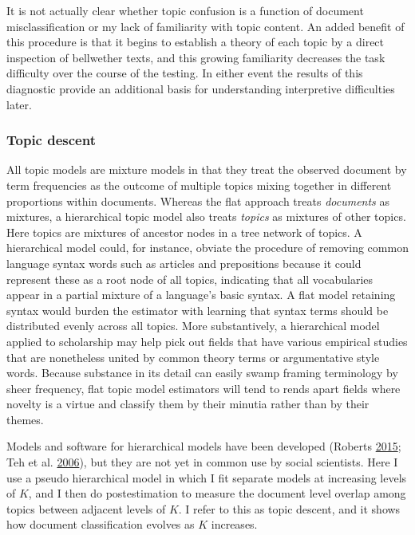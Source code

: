 \documentclass[]{book}
\theoremstyle{definition}
\theoremstyle{definition}
\theoremstyle{definition}
\theoremstyle{remark}
\begin{document}
It is not actually clear whether topic confusion is a function of
document misclassification or my lack of familiarity with topic content.
An added benefit of this procedure is that it begins to establish a
theory of each topic by a direct inspection of bellwether texts, and
this growing familiarity decreases the task difficulty over the course
of the testing. In either event the results of this diagnostic provide
an additional basis for understanding interpretive difficulties later.

\hypertarget{topic-descent}{%
\subsubsection{Topic descent}\label{topic-descent}}

All topic models are mixture models in that they treat the observed
document by term frequencies as the outcome of multiple topics mixing
together in different proportions within documents. Whereas the flat
approach treats \emph{documents} as mixtures, a hierarchical topic model
also treats \emph{topics} as mixtures of other topics. Here topics are
mixtures of ancestor nodes in a tree network of topics. A hierarchical
model could, for instance, obviate the procedure of removing common
language syntax words such as articles and prepositions because it could
represent these as a root node of all topics, indicating that all
vocabularies appear in a partial mixture of a language's basic syntax. A
flat model retaining syntax would burden the estimator with learning
that syntax terms should be distributed evenly across all topics. More
substantively, a hierarchical model applied to scholarship may help pick
out fields that have various empirical studies that are nonetheless
united by common theory terms or argumentative style words. Because
substance in its detail can easily swamp framing terminology by sheer
frequency, flat topic model estimators will tend to rends apart fields
where novelty is a virtue and classify them by their minutia rather than
by their themes.

Models and software for hierarchical models have been developed (Roberts
\protect\hyperlink{ref-Roberts2015pkg}{2015}; Teh et al.
\protect\hyperlink{ref-Teh2006Hierarchical}{2006}), but they are not yet
in common use by social scientists. Here I use a pseudo hierarchical
model in which I fit separate models at increasing levels of \(K\), and
I then do postestimation to measure the document level overlap among
topics between adjacent levels of \(K\). I refer to this as topic
descent, and it shows how document classification evolves as \(K\)
increases.
\end{document}
